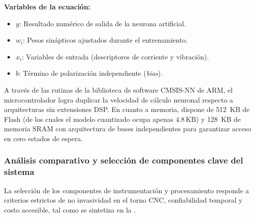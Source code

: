 \noindent\textbf{Variables de la ecuación:}
\begin{itemize}
    \item $y$: Resultado numérico de salida de la neurona artificial.
    \item $w_i$: Pesos sinápticos ajustados durante el entrenamiento.
    \item $x_i$: Variables de entrada (descriptores de corriente y vibración).
    \item $b$: Término de polarización independiente (\textit{bias}).
\end{itemize}

A través de las rutinas de la biblioteca de software CMSIS-NN de ARM, el microcontrolador logra duplicar la velocidad de cálculo neuronal respecto a arquitecturas sin extensiones DSP. En cuanto a memoria, dispone de 512~KB de Flash (de los cuales el modelo cuantizado ocupa apenas $4.8\,\text{KB}$) y 128~KB de memoria SRAM con arquitectura de buses independientes para garantizar acceso en cero estados de espera.


\subsubsection{Análisis comparativo y selección de componentes clave del sistema}

La selección de los componentes de instrumentación y procesamiento responde a criterios estrictos de no invasividad en el torno CNC, confiabilidad temporal y costo accesible, tal como se sintetiza en la .

